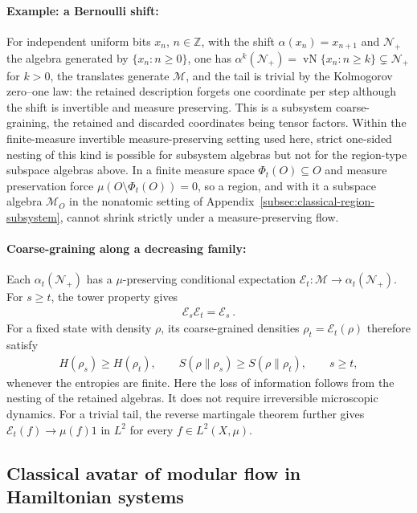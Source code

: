 \documentclass[a4paper,11pt]{article}
\theoremstyle{definition}
\newcommand{\mN}{\mathcal{N}}
\newcommand{\mM}{\mathcal{M}}
\newcommand{\mE}{\mathcal{E}}
\begin{document}
\paragraph{Example: a Bernoulli shift:}
For independent uniform bits $x_n$, $n\in\mathbb Z$, with the shift $\alpha(x_n)=x_{n+1}$ and $\mN_+$ the algebra generated by $\{x_n:n\geq0\}$, one has $\alpha^k(\mN_+)=\operatorname{vN}\{x_n:n\geq k\}\subsetneq\mN_+$ for $k>0$, the translates generate $\mM$, and the tail is trivial by the Kolmogorov zero--one law: the retained description forgets one coordinate per step although the shift is invertible and measure preserving. This is a subsystem coarse-graining, the retained and discarded coordinates being tensor factors. Within the finite-measure invertible measure-preserving setting used here, strict one-sided nesting of this kind is possible for subsystem algebras but not for the region-type subspace algebras above. In a finite measure space $\Phi_t(O)\subseteq O$ and measure preservation force $\mu(O\setminus\Phi_t(O))=0$, so a region, and with it a subspace algebra $\mM_O$ in the nonatomic setting of Appendix~\ref{subsec:classical-region-subsystem}, cannot shrink strictly under a measure-preserving flow.

\paragraph{Coarse-graining along a decreasing family:}
Each $\alpha_t(\mN_+)$ has a $\mu$-preserving conditional expectation $\mE_t:\mM\to\alpha_t(\mN_+)$. For $s\geq t$, the tower property gives
\begin{align}
    \mE_s\mE_t=\mE_s\ .
\end{align}
For a fixed state with density $\rho$, its coarse-grained densities $\rho_t=\mE_t(\rho)$ therefore satisfy
\begin{align}
    H(\rho_s)\geq H(\rho_t),
    \qquad
    S(\rho\|\rho_s)\geq S(\rho\|\rho_t),
    \qquad s\geq t,
\end{align}
whenever the entropies are finite. Here the loss of information follows from the nesting of the retained algebras. It does not require irreversible microscopic dynamics. For a trivial tail, the reverse martingale theorem further gives $\mE_t(f)\to\mu(f)1$ in $L^2$ for every $f\in L^2(X,\mu)$.

\subsection{Classical avatar of modular flow in Hamiltonian systems}
\label{subsec:classical-state-flow}
\end{document}
